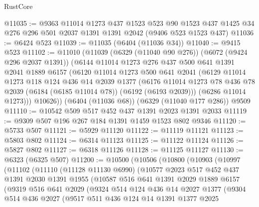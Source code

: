 \begin{lexlean}{RustCore}
\begin{coremodule}
@11035 := @9363
    @11014
    @1273
    @437
    @1523
    @523
    @90
    @1523
    @437
    @1425
    @34
    @276
    @296
    @501
    @2037
    @1391
    @1391
    @2042
    (@9406 @523 @1523 @437)
@11036 := @6424 @523
@11039 := @11035 (@6404 (@11036 @34))
@11040 := @9415 @523
@11102 := @11010
    (@11039
      (@6329 (@11040 @90 @276))
      (@6072 (@9424 @296 @2037 @1391))
      (@6144
        @11014
        @1273
        @276
        @437
        @500
        @641
        @1391
        @2041
        @1889
        @6157
        (@6120
          @11014
          @1273
          @500
          @641
          @2041
          (@6129
            @11014
            @1273
            @118
            @124
            @436
            @14
            @2039
            @1377
            (@6176 @11014 @1273 @78 @436 @78 @2039 (@6184 (@6185 @11014 @78)) (@6192 (@6193 @2039)))
            (@6286 @11014 @1273)))
        @10626))
    (@6404 (@11036 @68))
    (@6329 (@11040 @177 @286))
    @9509
@11110 := @10542 @509 @517 @452 @437 @1391 @2023 @1391 @2033
@11119 := @9309 @507 @196 @267 @184 @1391 @1459 @1523 @802 @9346
@11120 := @5733 @507
@11121 := @5929 @11120
@11122 := @11119 @11121
@11123 := @5803 @802
@11124 := @6314 @11123
@11125 := @11122 @11124
@11126 := @5827 @802
@11127 := @6318 @11126
@11128 := @11125 @11127
@11130 := @6323 (@6325 @507)
@11200 := @10500
    (@10506
      (@10800
        (@10903
          (@10997
            (@11102
              (@11110
                (@11128 @11130 @6990)
                (@10577
                  @2023
                  @517
                  @452
                  @437
                  @1391
                  @2030
                  @1391
                  @1955
                  (@10587
                    @516
                    @641
                    @1391
                    @2029
                    @1889
                    @6157
                    (@9319
                      @516
                      @641
                      @2029
                      (@9324
                        @514
                        @124
                        @436
                        @14
                        @2027
                        @1377
                        (@9304
                          @514
                          @436
                          @2027
                          (@9517
                            @511
                            @436
                            @124
                            @14
                            @1391
                            @1377
                            @2025

\end{coremodule}
\end{lexlean}
